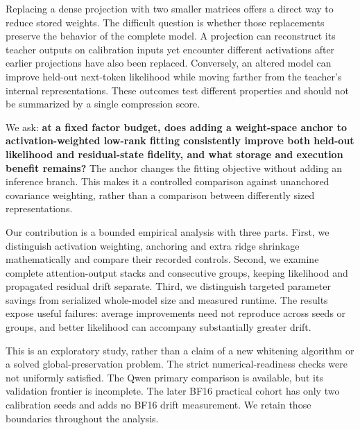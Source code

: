 \documentclass[10pt,a4paper,twocolumn]{article}
\makeatletter
\renewcommand\section{\@startsection{section}{1}{0pt}{2.2ex plus 1ex minus .2ex}{1.1ex plus .2ex}{\normalfont\normalsize\bfseries\centering}}
\makeatother
\begin{document}
\section{Introduction}
Replacing a dense projection with two smaller matrices offers a direct way to reduce stored weights. The difficult question is whether those replacements preserve the behavior of the complete model. A projection can reconstruct its teacher outputs on calibration inputs yet encounter different activations after earlier projections have also been replaced. Conversely, an altered model can improve held-out next-token likelihood while moving farther from the teacher's internal representations. These outcomes test different properties and should not be summarized by a single compression score.\par\smallskip
We ask: \textbf{at a fixed factor budget, does adding a weight-space anchor to activation-weighted low-rank fitting consistently improve both held-out likelihood and residual-state fidelity, and what storage and execution benefit remains?} The anchor changes the fitting objective without adding an inference branch. This makes it a controlled comparison against unanchored covariance weighting, rather than a comparison between differently sized representations.\par\smallskip
Our contribution is a bounded empirical analysis with three parts. First, we distinguish activation weighting, anchoring and extra ridge shrinkage mathematically and compare their recorded controls. Second, we examine complete attention-output stacks and consecutive groups, keeping likelihood and propagated residual drift separate. Third, we distinguish targeted parameter savings from serialized whole-model size and measured runtime. The results expose useful failures: average improvements need not reproduce across seeds or groups, and better likelihood can accompany substantially greater drift.\par\smallskip
This is an exploratory study, rather than a claim of a new whitening algorithm or a solved global-preservation problem. The strict numerical-readiness checks were not uniformly satisfied. The Qwen primary comparison is available, but its validation frontier is incomplete. The later BF16 practical cohort has only two calibration seeds and adds no BF16 drift measurement. We retain those boundaries throughout the analysis.\par\smallskip
\end{document}
